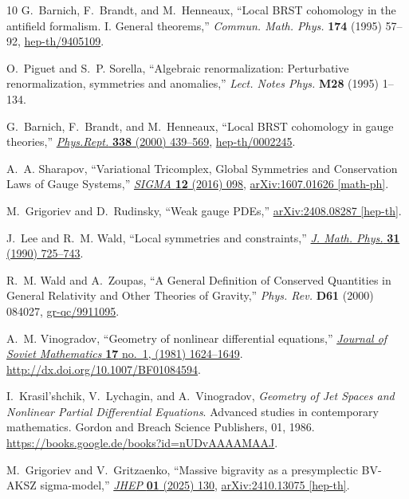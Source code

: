 \documentclass[a4paper,12pt]{article}
\numberwithin{equation}{section} %
\begin{document}
\begin{thebibliography}{10}
G.~Barnich, F.~Brandt, and M.~Henneaux, ``{L}ocal {BRST} cohomology in the antifield formalism. {I}. {G}eneral theorems,'' {\em Commun. Math. Phys.} {\bfseries 174} (1995) 57--92,
\href{http://arxiv.org/abs/hep-th/9405109}{{\ttfamily hep-th/9405109}}.

O.~Piguet and S.~P. Sorella, ``{A}lgebraic renormalization: {P}erturbative renormalization, symmetries and anomalies,''
{\em Lect. Notes Phys.} {\bfseries M28} (1995) 1--134.

G.~Barnich, F.~Brandt, and M.~Henneaux, ``{L}ocal {BRST} cohomology in gauge theories,'' \href{http://dx.doi.org/10.1016/S0370-1573(00)00049-1}{{\em Phys.Rept.} {\bfseries 338} (2000) 439--569},
\href{http://arxiv.org/abs/hep-th/0002245}{{\ttfamily hep-th/0002245}}.

A.~A. Sharapov, ``{Variational Tricomplex, Global Symmetries and Conservation Laws of Gauge Systems},'' \href{http://dx.doi.org/10.3842/SIGMA.2016.098}{{\em SIGMA} {\bfseries 12} (2016) 098}, \href{http://arxiv.org/abs/1607.01626}{{\ttfamily arXiv:1607.01626 [math-ph]}}.

M.~Grigoriev and D.~Rudinsky, ``{Weak gauge PDEs},'' \href{http://arxiv.org/abs/2408.08287}{{\ttfamily arXiv:2408.08287 [hep-th]}}.

J.~Lee and R.~M. Wald, ``{Local symmetries and constraints},'' \href{http://dx.doi.org/10.1063/1.528801}{{\em J. Math. Phys.} {\bfseries 31} (1990) 725--743}.

R.~M. Wald and A.~Zoupas, ``{A} {G}eneral {D}efinition of {C}onserved {Q}uantities in {G}eneral {R}elativity and {O}ther {T}heories of {G}ravity,'' {\em Phys. Rev.} {\bfseries D61} (2000) 084027,
\href{http://arxiv.org/abs/gr-qc/9911095}{{\ttfamily gr-qc/9911095}}.

A.~M. Vinogradov, ``{G}eometry of nonlinear differential equations,'' \href{http://dx.doi.org/10.1007/BF01084594}{{\em Journal of Soviet Mathematics} {\bfseries 17} no.~1, (1981) 1624--1649}. \url{http://dx.doi.org/10.1007/BF01084594}.

I.~Krasil'shchik, V.~Lychagin, and A.~Vinogradov, {\em Geometry of Jet Spaces and Nonlinear Partial Differential Equations}.
\newblock Advanced studies in contemporary mathematics. Gordon and Breach Science Publishers, 01, 1986.
\newblock \url{https://books.google.de/books?id=nUDvAAAAMAAJ}.

M.~Grigoriev and V.~Gritzaenko, ``{Massive bigravity as a presymplectic BV-AKSZ sigma-model},'' \href{http://dx.doi.org/10.1007/JHEP01(2025)130}{{\em JHEP} {\bfseries 01} (2025) 130}, \href{http://arxiv.org/abs/2410.13075}{{\ttfamily arXiv:2410.13075 [hep-th]}}.

\end{thebibliography}\endgroup
\end{document}
